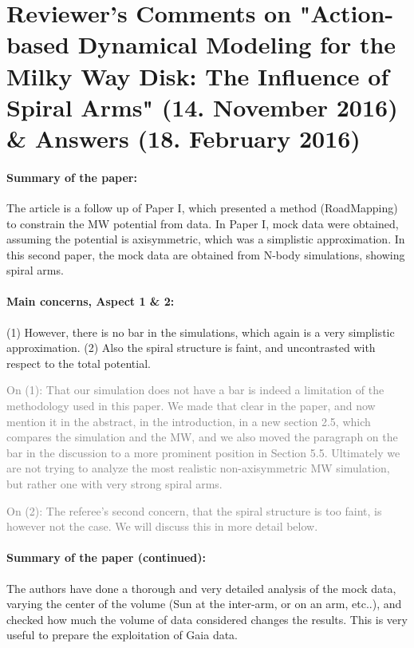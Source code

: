 \documentclass[10pt,a4paper]{article}
\newcommand{\Answer}[1]{\textcolor{Gray}{#1}}
\begin{document}
\section*{Reviewer's Comments on "Action-based Dynamical Modeling for the Milky Way Disk: The Influence of Spiral Arms" (14. November 2016) \& Answers (18. February 2016)}

\paragraph{Summary of the paper:} The article is a follow up of Paper I, which presented a method (RoadMapping) to constrain the MW potential from data. In Paper I, mock data were obtained, assuming
the potential is axisymmetric, which was a simplistic approximation. In this second
paper, the mock data are obtained from N-body simulations, showing spiral arms.

\paragraph{Main concerns, Aspect 1 \& 2:} (1) However, there is no bar in the simulations, which again is a very simplistic approximation.  (2) Also the spiral structure is faint, and uncontrasted with respect to
the total potential.

\Answer{On (1): That our simulation does not have a bar is indeed a limitation of the methodology used in this paper. We made that clear in the paper, and now mention it in the abstract, in the introduction, in a new section 2.5, which compares the simulation and the MW, and we also moved the paragraph on the bar in the discussion to a more prominent position in Section 5.5. Ultimately we are not trying to analyze the most realistic non-axisymmetric MW simulation, but rather one with very strong spiral arms.}

\Answer{On (2): The referee's second concern, that the spiral structure is too faint, is however not the case. We will discuss this in more detail below.}
 
\paragraph{Summary of the paper (continued):} The authors have done a thorough and very detailed analysis of the mock data, varying the center of the volume (Sun at the inter-arm, or on an arm, etc..), and
checked how much the volume of data considered changes the results. This is very
useful to prepare the exploitation of Gaia data.
\end{document}
